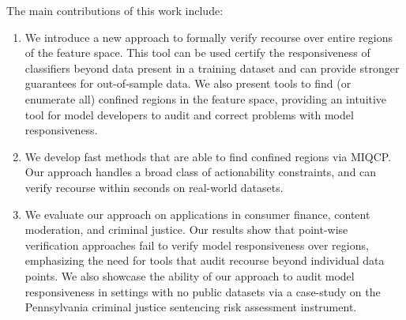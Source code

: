 The main contributions of this work include:
%
\begin{enumerate}[leftmargin=*,itemsep=0pt]
    \item We introduce a new approach to formally verify recourse %
    over entire regions of the feature space. This tool can be used certify the responsiveness of classifiers beyond data present in a training dataset and can provide stronger guarantees for out-of-sample data. We also present tools to find (or enumerate all) confined regions in the feature space, providing an intuitive tool for model developers to audit and correct problems with model responsiveness.

    \item We develop fast methods that are able to find confined regions via MIQCP. Our approach handles a broad class of actionability constraints, and can verify recourse within seconds on real-world datasets.
    
    \item We evaluate our approach on applications in consumer finance, content moderation, and criminal justice. Our results show that point-wise verification approaches fail to verify model responsiveness over regions, emphasizing the need for tools that audit recourse beyond individual data points. We also showcase the ability of our approach to audit model responsiveness in settings with no public datasets via a case-study on the Pennsylvania criminal justice sentencing risk assessment instrument.

    
\end{enumerate}


